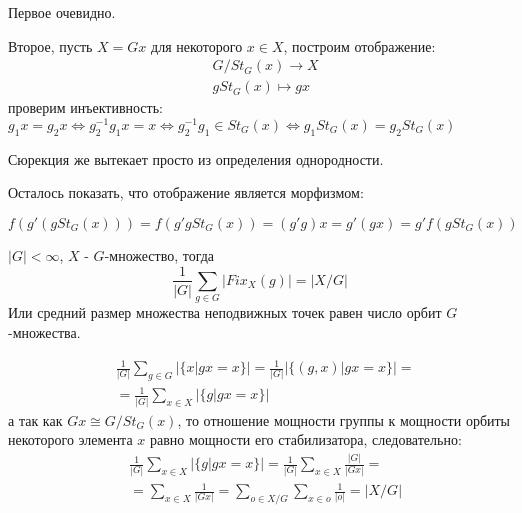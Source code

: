 \begin{Proof}
Первое очевидно.

Второе, пусть $X = Gx$ для некоторого $x \in X$, построим отображение:
\[
	\begin{split}
		& G / St_G\left(x\right) \rightarrow X \\
		& g St_G\left(x\right) \mapsto gx
	\end{split}
\]
проверим инъективность: $g_1 x = g_2 x \Leftrightarrow g_2^{-1} g_1 x = x \Leftrightarrow g_2^{-1} g_1 \in St_G\left(x\right) \Leftrightarrow g_1 St_G\left(x\right) = g_2 St_G\left(x\right)$

Сюрекция же вытекает просто из определения однородности.

Осталось показать, что отображение является морфизмом:

$f\left(g'\left(gSt_G\left(x\right)\right)\right) = f\left(g'gSt_G\left(x\right)\right) = \left(g'g\right)x = g'\left(gx\right) = g'f\left(gSt_G\left(x\right)\right)$
\end{Proof}

\begin{Th}
$\left|G\right| < \infty$, $X$ - $G$-множество, тогда
\[
	\frac{1}{\left|G\right|}\sum_{g \in G} \left|Fix_X\left(g\right)\right| = \left|X/G\right|
\]
Или средний размер множества неподвижных точек равен число орбит $G$-множества.
\end{Th}

\begin{Proof}
\[
	\begin{split}
		& \frac{1}{\left|G\right|} \sum_{g \in G} \left|\lbrace x | gx = x\rbrace\right| = \frac{1}{\left|G\right|} \left|\lbrace \left(g,x\right) | gx = x \rbrace\right| = \\
		& = \frac{1}{\left|G\right|} \sum_{x \in X} \left|\lbrace g | gx = x\rbrace\right|
	\end{split}
\]
а так как $Gx \cong G / St_G\left(x\right)$, то отношение мощности группы к мощности орбиты некоторого элемента $x$ равно мощности его стабилизатора, следовательно:
\[
	\begin{split}
		& \frac{1}{\left|G\right|} \sum_{x \in X} \left|\lbrace g | gx = x\rbrace\right| = \frac{1}{\left|G\right|} \sum_{x \in X} \frac{\left|G\right|}{\left|Gx\right|} = \\
		& = \sum_{x \in X} \frac{1}{\left|Gx\right|} = \sum_{o \in X/G} \sum_{x \in o} \frac{1}{\left|o\right|} = \left|X/G\right|
	\end{split}
\]
\end{Proof}

